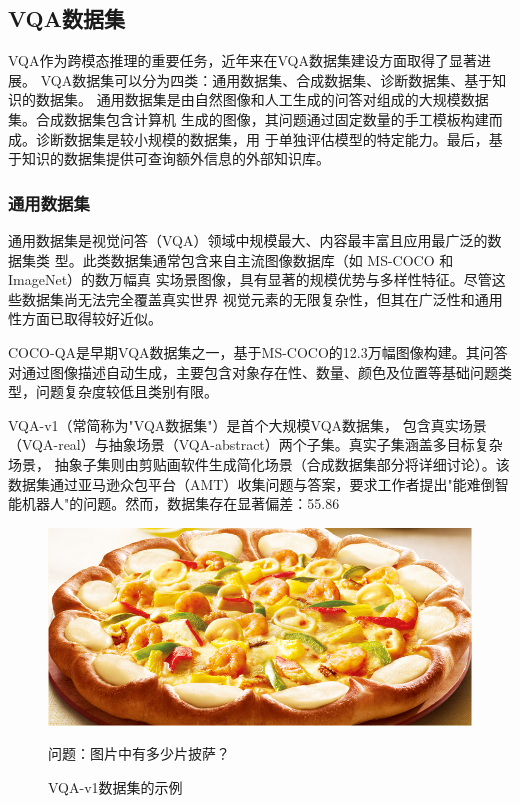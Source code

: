 \subsection{VQA数据集}
VQA作为跨模态推理的重要任务，近年来在VQA数据集建设方面取得了显著进展。
VQA数据集可以分为四类：通用数据集、合成数据集、诊断数据集、基于知识的数据集。
通用数据集是由自然图像和人工生成的问答对组成的大规模数据集。合成数据集包含计算机
生成的图像，其问题通过固定数量的手工模板构建而成。诊断数据集是较小规模的数据集，用
于单独评估模型的特定能力。最后，基于知识的数据集提供可查询额外信息的外部知识库。
\subsubsection{通用数据集}
通用数据集是视觉问答（VQA）领域中规模最大、内容最丰富且应用最广泛的数据集类
型。此类数据集通常包含来自主流图像数据库（如 MS-COCO\cite{lin2014microsoft} 和 ImageNet\cite{deng2009imagenet}）的数万幅真
实场景图像，具有显著的规模优势与多样性特征。尽管这些数据集尚无法完全覆盖真实世界
视觉元素的无限复杂性，但其在广泛性和通用性方面已取得较好近似。

COCO-QA是早期VQA数据集之一，基于MS-COCO的12.3万幅图像构建。其问答对通过图像描述自动生成，主要包含对象存在性、数量、颜色及位置等基础问题类型，问题复杂度较低且类别有限。

VQA-v1\cite{Antol2015VQA}（常简称为"VQA数据集"）是首个大规模VQA数据集，
包含真实场景（VQA-real）与抽象场景（VQA-abstract）两个子集。真实子集涵盖多目标复杂场景，
抽象子集则由剪贴画软件生成简化场景（合成数据集部分将详细讨论）。该数据集通过亚马逊众包平台（AMT）收集问题与答案，要求工作者提出"能难倒智能机器人"的问题。然而，数据集存在显著偏差：55.86%
\begin{figure}[h]
    \centering
    \includegraphics[scale=0.4]{figures/example-from-vqa-v1.jpg}
    \begin{center}
        \footnotesize 问题：图片中有多少片披萨？
    \end{center}
    \caption{VQA-v1数据集的示例}
    \label{fig:example-from-vqa-v1}
\end{figure}

